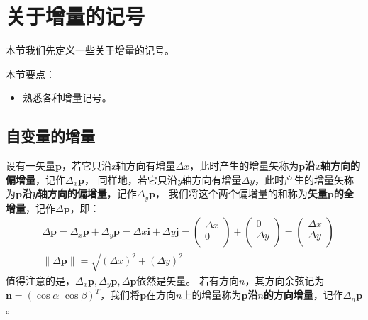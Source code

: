 \section{关于增量的记号}

本节我们先定义一些关于增量的记号。

本节要点：
\begin{itemize}
    \item 熟悉各种增量记号。
\end{itemize}

\subsection{自变量的增量}

\begin{definition}[自变量的增量]
设有一矢量$\boldsymbol{p}$，若它只沿{\it x}轴方向有增量$\Delta x$，此时产生的增量矢称为{\bf $\boldsymbol{p}$沿{\it x}轴方向的偏增量}，记作$\Delta _x\boldsymbol{p}$，
同样地，若它只沿{\it y}轴方向有增量$\Delta y$，此时产生的增量矢称为{\bf $\boldsymbol{p}$沿{\it y}轴方向的偏增量}，记作$\Delta _y\boldsymbol{p}$，
我们将这个两个偏增量的和称为{\bf 矢量$\boldsymbol{p}$的全增量}，记作$\Delta \boldsymbol{p}$，即：
\begin{align*}
&\Delta \boldsymbol{p}=\Delta _x\boldsymbol{p}+\Delta _y\boldsymbol{p}=\Delta x\mathbf{i}+\Delta y\mathbf{j}=\left( \begin{array}{c}
	\Delta x\\
	0\\
\end{array} \right) +\left( \begin{array}{c}
	0\\
	\Delta y\\
\end{array} \right) =\left( \begin{array}{c}
	\Delta x\\
	\Delta y\\
\end{array} \right) \\
&\left\| \Delta \boldsymbol{p} \right\| =\sqrt{\left( \Delta x \right) ^2+\left( \Delta y \right) ^2}
\end{align*}
值得注意的是，$\Delta _x\boldsymbol{p},\Delta _y\boldsymbol{p},\Delta \boldsymbol{p}$依然是矢量。
若有方向$n$，其方向余弦记为$\mathbf{n}=\left( \cos \alpha \,\,\cos \beta \right) ^T$，我们将$\boldsymbol{p}$在方向$n$上的增量称为{\bf $\boldsymbol{p}$沿$n$的方向增量}，记作$\Delta _n\boldsymbol{p}$。
\end{definition}

